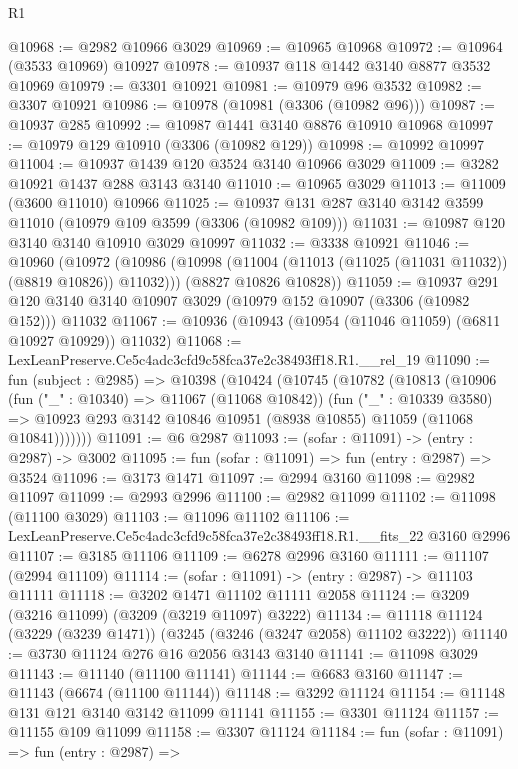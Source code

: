 \begin{lexlean}{R1}
\begin{coremodule}
@10968 := @2982 @10966 @3029
@10969 := @10965 @10968
@10972 := @10964 (@3533 @10969) @10927
@10978 := @10937 @118 @1442 @3140 @8877 @3532 @10969
@10979 := @3301 @10921
@10981 := @10979 @96 @3532
@10982 := @3307 @10921
@10986 := @10978 (@10981 (@3306 (@10982 @96)))
@10987 := @10937 @285
@10992 := @10987 @1441 @3140 @8876 @10910 @10968
@10997 := @10979 @129 @10910 (@3306 (@10982 @129))
@10998 := @10992 @10997
@11004 := @10937 @1439 @120 @3524 @3140 @10966 @3029
@11009 := @3282 @10921 @1437 @288 @3143 @3140
@11010 := @10965 @3029
@11013 := @11009 (@3600 @11010) @10966
@11025 := @10937 @131 @287 @3140 @3142 @3599 @11010 (@10979 @109 @3599 (@3306 (@10982 @109)))
@11031 := @10987 @120 @3140 @3140 @10910 @3029 @10997
@11032 := @3338 @10921
@11046 := @10960
    (@10972
      (@10986 (@10998 (@11004 (@11013 (@11025 (@11031 @11032)) (@8819 @10826)) @11032)))
      (@8827 @10826 @10828))
@11059 := @10937
    @291
    @120
    @3140
    @3140
    @10907
    @3029
    (@10979 @152 @10907 (@3306 (@10982 @152)))
    @11032
@11067 := @10936 (@10943 (@10954 (@11046 @11059) (@6811 @10927 @10929)) @11032)
@11068 := LexLeanPreserve.Ce5c4adc3cfd9c58fca37e2c38493ff18.R1.__rel_19
@11090 := fun (subject : @2985) =>
  @10398
    (@10424
      (@10745
        (@10782
          (@10813
            (@10906
              (fun ("_" : @10340) => @11067 (@11068 @10842))
              (fun ("_" : @10339 @3580) =>
              @10923 @293 @3142 @10846 @10951 (@8938 @10855) @11059 (@11068 @10841)))))))
@11091 := @6 @2987
@11093 := (sofar : @11091) -> (entry : @2987) -> @3002
@11095 := fun (sofar : @11091) => fun (entry : @2987) => @3524
@11096 := @3173 @1471
@11097 := @2994 @3160
@11098 := @2982 @11097
@11099 := @2993 @2996
@11100 := @2982 @11099
@11102 := @11098 (@11100 @3029)
@11103 := @11096 @11102
@11106 := LexLeanPreserve.Ce5c4adc3cfd9c58fca37e2c38493ff18.R1.__fits_22 @3160 @2996
@11107 := @3185 @11106
@11109 := @6278 @2996 @3160
@11111 := @11107 (@2994 @11109)
@11114 := (sofar : @11091) -> (entry : @2987) -> @11103 @11111
@11118 := @3202 @1471 @11102 @11111 @2058
@11124 := @3209 (@3216 @11099) (@3209 (@3219 @11097) @3222)
@11134 := @11118 @11124 (@3229 (@3239 @1471)) (@3245 (@3246 (@3247 @2058) @11102 @3222))
@11140 := @3730 @11124 @276 @16 @2056 @3143 @3140
@11141 := @11098 @3029
@11143 := @11140 (@11100 @11141)
@11144 := @6683 @3160
@11147 := @11143 (@6674 (@11100 @11144))
@11148 := @3292 @11124
@11154 := @11148 @131 @121 @3140 @3142 @11099 @11141
@11155 := @3301 @11124
@11157 := @11155 @109 @11099
@11158 := @3307 @11124
@11184 := fun (sofar : @11091) =>
  fun (entry : @2987) =>

\end{coremodule}
\end{lexlean}
